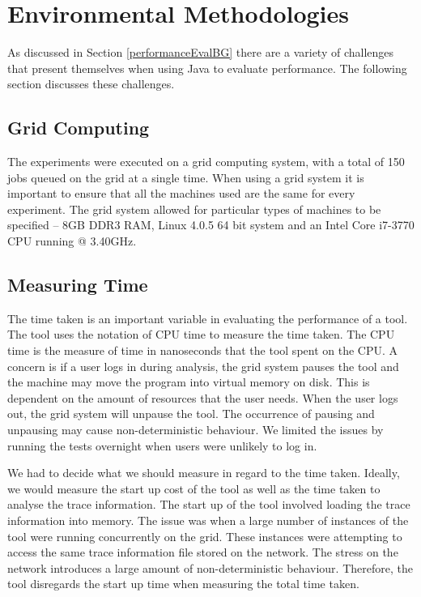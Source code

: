 \section{Environmental Methodologies}
\label{enviro}
As discussed in Section \ref{performanceEvalBG} there are a variety of challenges that present themselves when using Java to evaluate performance. The following section discusses these challenges.

\subsection{Grid Computing}
The experiments were executed on a grid computing system, with a total of 150 jobs queued on the grid at a single time. When using a grid system it is important to ensure that all the machines used are the same for every experiment. The grid system allowed for particular types of machines to be specified -- 8GB DDR3 RAM, Linux 4.0.5 64 bit system and an Intel Core i7-3770 CPU running @ 3.40GHz.

\subsection{Measuring Time }
The time taken is an important variable in evaluating the performance of a tool. The tool uses the notation of CPU time to measure the time taken. The CPU time is the measure of time in nanoseconds that the tool spent on the CPU. A concern is if a user logs in during analysis, the grid system pauses the tool and the machine may move the program into virtual memory on disk. This is dependent on the amount of resources that the user needs. When the user logs out, the grid system will unpause the tool. The occurrence of pausing and unpausing may cause non-deterministic behaviour.  We limited the issues by running the tests overnight when users were unlikely to log in.

We had to decide what we should measure in regard to the time taken. Ideally, we would measure the start up cost of the tool as well as the time taken to analyse the trace information. The start up of the tool involved loading the trace information into memory. The issue was when a large number of instances of the tool were running concurrently on the grid. These instances were attempting to access the same trace information file stored on the network. The stress on the network introduces a large amount of non-deterministic behaviour. Therefore, the tool disregards the start up time when measuring the total time taken.

